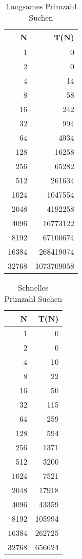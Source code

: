 \documentclass[paper=a4, fontsize=11pt]{scrartcl} %
\numberwithin{equation}{section} %
\numberwithin{figure}{section} %
\numberwithin{table}{section} %
\begin{document}
\begin{table}[h!]
  \centering
  \begin{tabular}{ r | r }
    N & T(N) \\
    \hline
    1 & 0 \\
    2 & 0 \\
    4 & 14 \\
    8 & 58 \\
    16 & 242 \\
    32 & 994 \\
    64 & 4034 \\
    128 & 16258 \\
    256 & 65282 \\
    512 & 261634 \\
    1024 & 1047554 \\
    2048 & 4192258 \\
    4096 & 16773122 \\
    8192 & 67100674 \\
    16384 & 268419074 \\
    32768 & 1073709058 \\
  \end{tabular}
  \caption{Langsames Primzahl Suchen}
  \label{table:1}
\end{table}

\begin{table}[h!]
  \centering
  \begin{tabular}{ r | r }
    N & T(N) \\
    \hline
    1 & 0 \\
    2 & 0 \\
    4 & 10 \\
    8 & 22 \\
    16 & 50 \\
    32 & 115 \\
    64 & 259 \\
    128 & 594 \\
    256 & 1371 \\
    512 & 3200 \\
    1024 & 7521 \\
    2048 & 17918 \\
    4096 & 43359 \\
    8192 & 105994 \\
    16384 & 262725 \\
    32768 & 656624 \\
  \end{tabular}
  \caption{Schnelles Primzahl Suchen}
  \label{table:2}
\end{table}
\end{document}
